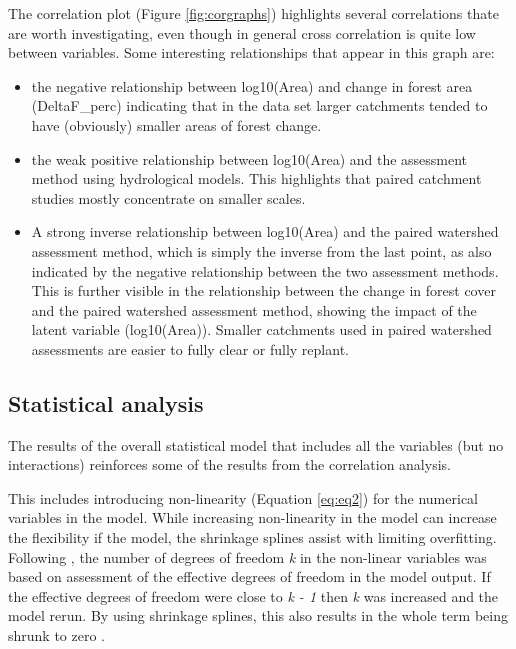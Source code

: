 \documentclass[]{elsarticle} %
\providecommand{\tightlist}{%
  \setlength{\itemsep}{0pt}\setlength{\parskip}{0pt}}
\begin{document}
The correlation plot (Figure \ref{fig:corgraphs}) highlights several correlations thate are worth investigating, even though in general cross correlation is quite low between variables. Some interesting relationships that appear in this graph are:

\begin{itemize}
\tightlist
\item
  the negative relationship between log10(Area) and change in forest area (DeltaF\_perc) indicating that in the data set larger catchments tended to have (obviously) smaller areas of forest change.\\
\item
  the weak positive relationship between log10(Area) and the assessment method using hydrological models. This highlights that paired catchment studies mostly concentrate on smaller scales.\\
\item
  A strong inverse relationship between log10(Area) and the paired watershed assessment method, which is simply the inverse from the last point, as also indicated by the negative relationship between the two assessment methods. This is further visible in the relationship between the change in forest cover and the paired watershed assessment method, showing the impact of the latent variable (log10(Area)). Smaller catchments used in paired watershed assessments are easier to fully clear or fully replant.
\end{itemize}

\hypertarget{statistical-analysis}{%
\subsection{Statistical analysis}\label{statistical-analysis}}

The results of the overall statistical model that includes all the variables (but no interactions) reinforces some of the results from the correlation analysis.

This includes introducing non-linearity (Equation \eqref{eq:eq2}) for the numerical variables in the model. While increasing non-linearity in the model can increase the flexibility if the model, the shrinkage splines assist with limiting overfitting. Following \citet{wood2006}, the number of degrees of freedom \emph{k} in the non-linear variables was based on assessment of the effective degrees of freedom in the model output. If the effective degrees of freedom were close to \emph{k - 1} then \emph{k} was increased and the model rerun. By using shrinkage splines, this also results in the whole term being shrunk to zero \citep{wood2006}.
\end{document}
